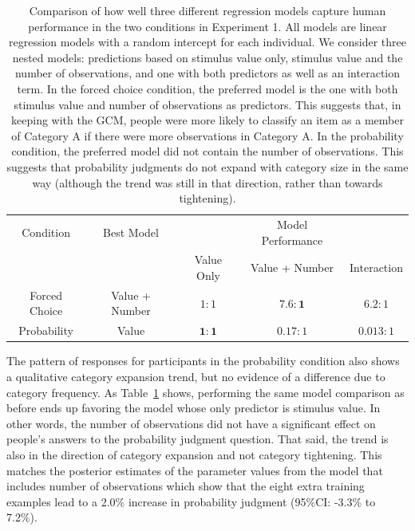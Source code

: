 \documentclass[doc,apacite]{apa6}
\begin{document}
\begin{table}[t]
  \centering
  \begin{tabular}{ccccc} %
    \toprule
    Condition & Best Model & & Model Performance & \\
    \cmidrule(lr){3-5}
    & & Value Only & Value + Number & Interaction \\
    \midrule
    Forced Choice & Value + Number & $ 1 : 1 $ & $ \mathbf{7.6 : 1} $ & $ 6.2 : 1 $ \\
    Probability & Value & $ \mathbf{1 : 1} $ & $ 0.17 : 1 $ & $ 0.013 : 1 $ \\
    \bottomrule
  \end{tabular}
  \vspace*{12pt}
  \caption{Comparison of how well three different regression models capture human performance in the two conditions in Experiment 1. All models are linear regression models with a random intercept for each individual. We consider three nested models: predictions based on stimulus value only, stimulus value and the number of observations, and one with both predictors as well as an interaction term. In the {\sc forced choice} condition, the preferred model is the one with both stimulus value and number of observations as predictors. This suggests that, in keeping with the GCM, people were more likely to classify an item as a member of Category A if there were more observations in Category A. In the {\sc probability} condition, the preferred model did not contain the number of observations. This suggests that probability judgments do not expand with category size in the same way (although the trend was still in that direction, rather than towards tightening).}
  \label{tab:expt1bayesfactors}
\end{table}


The pattern of responses for participants in the {\sc probability} condition also shows a qualitative category expansion trend, but no evidence of a difference due to category frequency. As Table~\ref{tab:expt1bayesfactors} shows, performing the same model comparison as before ends up favoring the model whose only predictor is stimulus value. In other words, the number of observations did not have a significant effect on people's answers to the probability judgment question. That said, the trend is also in the direction of category expansion and not category tightening. This matches the posterior estimates of the parameter values from the model that includes number of observations which show that the eight extra training examples lead to a 2.0\% increase in probability judgment (95\%CI: -3.3\% to 7.2\%).
\end{document}
